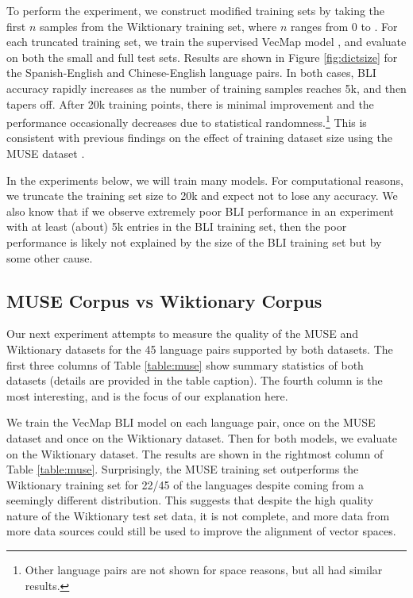 \documentclass[11pt]{article}
\begin{document}
To perform the experiment, we construct modified training sets by taking the first $n$ samples from the Wiktionary training set,
where $n$ ranges from 0 to .
For each truncated training set, we train the supervised VecMap model \citep{artetxe2018generalizing},
and evaluate on both the small and full test sets.
Results are shown in Figure \ref{fig:dictsize} for the Spanish-English and Chinese-English language pairs.
In both cases, BLI accuracy rapidly increases as the number of training samples reaches 5k, and then tapers off.
After 20k training points, there is minimal improvement and the performance occasionally decreases due to statistical randomness.\footnote{Other language pairs are not shown for space reasons, but all had similar results.}
This is consistent with previous findings on the effect of training dataset size using the MUSE dataset \citep{vulic2016role,qiu2018revisiting,glavas2019properly}.

In the experiments below, we will train many models.
For computational reasons, we truncate the training set size to 20k and expect not to lose any accuracy.
We also know that if we observe extremely poor BLI performance in an experiment with at least (about) 5k entries in the BLI training set,
then the poor performance is likely not explained by the size of the BLI training set but by some other cause.

\subsection{MUSE Corpus vs Wiktionary Corpus}
\label{sec:muse}

Our next experiment attempts to measure the quality of the MUSE and Wiktionary datasets for the 45 language pairs supported by both datasets.
The first three columns of Table \ref{table:muse} show summary statistics of both datasets (details are provided in the table caption).
The fourth column is the most interesting, and is the focus of our explanation here.

We train the VecMap \citep{artetxe2018generalizing} BLI model on each language pair,
once on the MUSE dataset and once on the Wiktionary dataset.
Then for both models, we evaluate on the Wiktionary dataset.
The results are shown in the rightmost column of Table \ref{table:muse}.
Surprisingly, the MUSE training set outperforms the Wiktionary training set for 22/45 of the languages despite coming from a seemingly different distribution.
This suggests that despite the high quality nature of the Wiktionary test set data,
it is not complete,
and more data from more data sources could still be used to improve the alignment of vector spaces.
\end{document}
